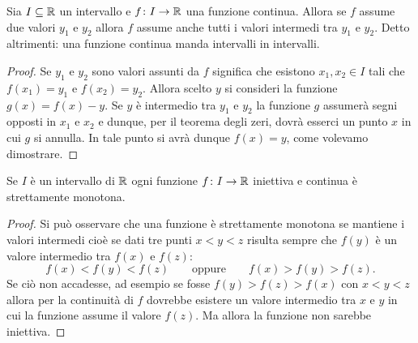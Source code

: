 \begin{corollary}
\mymark{**}
Sia $I\subseteq \mathbb R$ un intervallo e $f\colon I \to \mathbb R$ una
funzione continua.
Allora se $f$ assume due valori $y_1$ e $y_2$ allora $f$
assume anche tutti i valori intermedi tra $y_1$ e $y_2$.
Detto altrimenti: una funzione continua
manda intervalli in intervalli.
\end{corollary}
%
\begin{proof}
Se $y_1$ e $y_2$ sono valori assunti da $f$ significa
che esistono $x_1,x_2 \in I$ tali che $f(x_1)= y_1$ e $f(x_2)=y_2$.
Allora scelto $y$ si consideri la funzione $g(x) = f(x)-y$.
Se $y$ è intermedio tra $y_1$ e $y_2$ la funzione $g$ assumerà
segni opposti in $x_1$ e $x_2$ e dunque, per il teorema degli zeri,
dovrà esserci un punto $x$ in cui $g$ si annulla. In tale punto
si avrà dunque $f(x)=y$, come volevamo dimostrare.
\end{proof}

\begin{lemma}
Se $I$ è un intervallo di $\mathbb R$ ogni funzione $f\colon I \to \mathbb R$
iniettiva e continua è strettamente monotona.
\end{lemma}
%
\begin{proof}
Si può osservare che una funzione è strettamente monotona se mantiene i valori
intermedi cioè se dati tre punti
$x<y<z$ risulta sempre che $f(y)$ è un valore intermedio tra $f(x)$ e $f(z)$:
\[
  f(x)< f(y) <f(z) \qquad\text{oppure} \qquad f(x)> f(y) > f(z).
\]
Se ciò non accadesse, ad esempio se fosse $f(y)>f(z)>f(x)$ con $x<y<z$
allora per la continuità di $f$ dovrebbe esistere un valore intermedio
tra $x$ e $y$ in cui la funzione assume il valore $f(z)$. Ma allora la funzione
non sarebbe iniettiva.
\end{proof}

